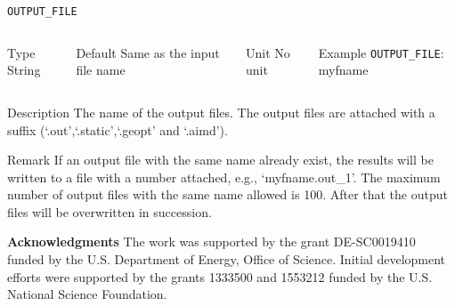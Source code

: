\documentclass[xcolor=dvipsnames,t]{beamer}
\begin{document}
\begin{frame}[allowframebreaks]{\texttt{OUTPUT\_FILE}} \label{OUTPUT_FILE}
\vspace*{-12pt}
\begin{columns}
\begin{block}{Type}
String
\end{block}

\begin{block}{Default}
Same as the input file name
\end{block}

\begin{block}{Unit}
No unit
\end{block}

\begin{block}{Example}
\texttt{OUTPUT\_FILE}: myfname
\end{block}
\end{columns}

\begin{block}{Description}
The name of the output files. The output files are attached with a suffix (`.out',`.static',`.geopt' and `.aimd'). 
\end{block}

\begin{block}{Remark}
If an output file with the same name already exist, the results will be written to a file with a number attached, e.g., `myfname.out\_1'. The maximum number of output files with the same name allowed is 100. After that the output files will be overwritten in succession.
\end{block}

\end{frame}



\begin{frame}[allowframebreaks]{\textbf{Acknowledgments}} \label{Acknowledgments}
The work was supported by the grant DE-SC0019410 funded by the U.S. Department of Energy, Office of Science. Initial development efforts were supported by the grants 1333500 and 1553212 funded by the U.S. National Science Foundation.
\end{frame}
\end{document}

